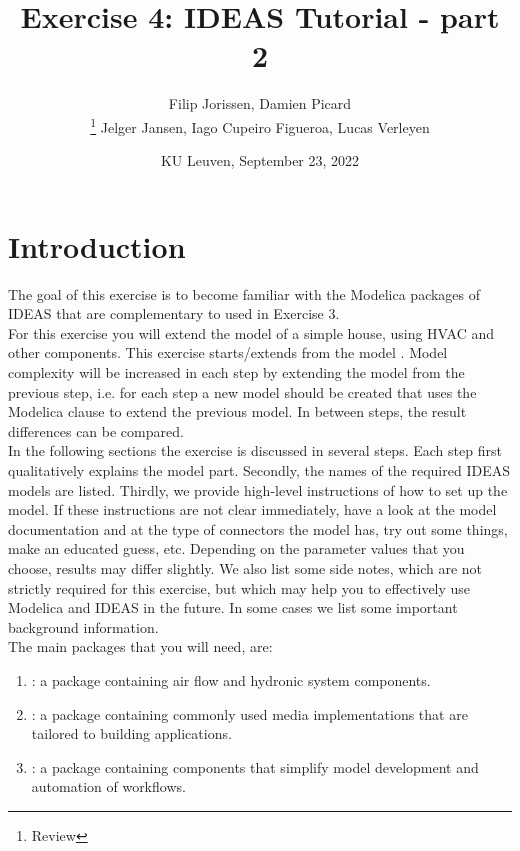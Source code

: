 \documentclass[10pt,a4paper]{article}
\begin{document}
\title{Exercise 4: IDEAS Tutorial - part 2}
\author{Filip Jorissen, Damien Picard\\ \thanks{Review} Jelger Jansen, Iago Cupeiro Figueroa, Lucas Verleyen}
\date{KU Leuven, September 23, 2022}
\maketitle

\doclicenseThis

\section*{Introduction}
The goal of this exercise is to become familiar with the 
Modelica packages of IDEAS that are
complementary to  used in Exercise 3. \\

For this exercise you will extend the model of a simple house,
using HVAC and other components.
This exercise starts/extends from the model . 
Model complexity will be increased in each step by 
extending the model from the previous step, i.e. for each step a new model should be created that uses
the Modelica  clause to extend the previous model.
In between steps, the result differences can be compared.\\


In the following sections the exercise is discussed 
in several steps. 
Each step first qualitatively explains the model part.
Secondly, the names of the required IDEAS models 
are listed.
Thirdly, we provide high-level instructions of how to
set up the model.
If these instructions are not clear immediately, 
have a look at the model documentation and at the type of
connectors the model has, 
try out some things, 
make an educated guess, etc.
Depending on the parameter values that you choose, results
may differ slightly.
We also list some side notes, which are not strictly required for this
exercise, but which may help you to effectively use Modelica
and IDEAS in the future.
In some cases we list some important background information.\\

The main packages that you will need, are:
\begin{enumerate}
\item {}: a package containing air flow and hydronic system components.
\item {}: a package containing commonly used media implementations that are tailored to building applications.
\item {}: a package containing components that simplify model development and automation of workflows.
\end{enumerate}
\end{document}
